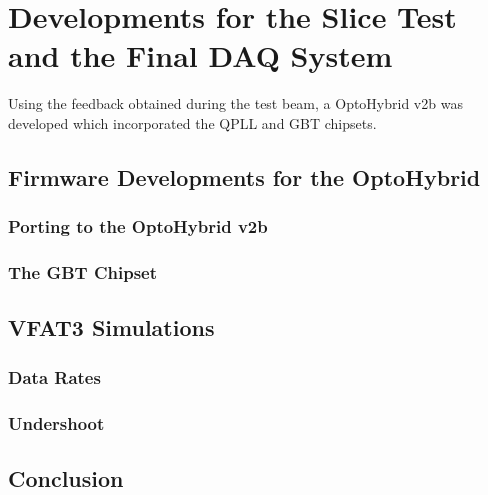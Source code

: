 \chapter{Developments for the Slice Test and the Final DAQ System}
\label{chap:II-4-slice-test}

  Using the feedback obtained during the test beam, a OptoHybrid v2b was developed which incorporated the QPLL and GBT chipsets. 

  \section{Firmware Developments for the OptoHybrid}

    \subsection{Porting to the OptoHybrid v2b}

    \subsection{The GBT Chipset}

  \section{VFAT3 Simulations}

    \subsection{Data Rates}

    \subsection{Undershoot}

  \section{Conclusion}
